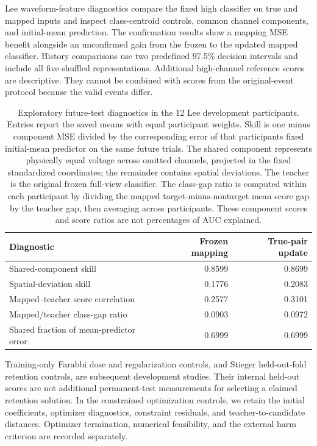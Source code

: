 \documentclass[11pt,a4paper]{article}
\begin{document}
Lee waveform-feature diagnostics compare the fixed high classifier on true and mapped inputs and inspect class-centroid controls, common channel components, and initial-mean prediction. The confirmation results show a mapping MSE benefit alongside an unconfirmed gain from the frozen to the updated mapped classifier. History comparisons use two predefined 97.5\% decision intervals and include all five shuffled representations. Additional high-channel reference scores are descriptive. They cannot be combined with scores from the original-event protocol because the valid events differ.

\begin{table}[tbp]
\centering\small
\caption{Exploratory future-test diagnostics in the 12 Lee development participants. Entries report the saved means with equal participant weights. Skill is one minus component MSE divided by the corresponding error of that participant\textquotesingle s fixed initial-mean predictor on the same future trials. The shared component represents physically equal voltage across omitted channels, projected in the fixed standardized coordinates; the remainder contains spatial deviations. The teacher is the original frozen full-view classifier. The class-gap ratio is computed within each participant by dividing the mapped target-minus-nontarget mean score gap by the teacher gap, then averaging across participants. These component scores and score ratios are not percentages of AUC explained.}
\label{tab:lee-development-diagnostics}
\begin{tabular}{@{}lrr@{}}
\toprule
Diagnostic & Frozen mapping & True-pair update\\
\midrule
Shared-component skill & 0.8599 & 0.8699\\
Spatial-deviation skill & 0.1776 & 0.2083\\
Mapped--teacher score correlation & 0.2577 & 0.3101\\
Mapped/teacher class-gap ratio & 0.0903 & 0.0972\\
Shared fraction of mean-predictor error & 0.6999 & 0.6999\\
\bottomrule
\end{tabular}
\end{table}

Training-only Farabbi dose and regularization controls, and Stieger held-out-fold retention controls, are subsequent development studies. Their internal held-out scores are not additional permanent-test measurements for selecting a claimed retention solution. In the constrained optimization controls, we retain the initial coefficients, optimizer diagnostics, constraint residuals, and teacher-to-candidate distances. Optimizer termination, numerical feasibility, and the external harm criterion are recorded separately.
\end{document}
